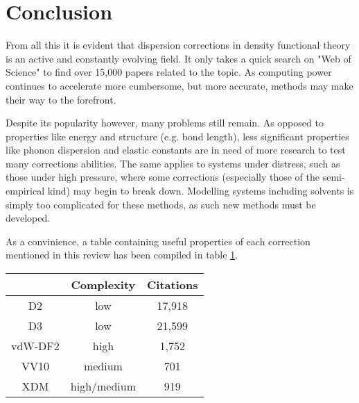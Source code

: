 \documentclass[10pt,a4paper,twocolumn,twoside]{extarticle}
\begin{document}
	\section{Conclusion}
	From all this it is evident that dispersion corrections in density functional theory is an active and constantly evolving field. It only takes a quick search on "Web of Science" to find over 15,000 papers related to the topic. As computing power continues to accelerate more cumbersome, but more accurate, methods may make their way to the forefront.

	Despite its popularity however, many problems still remain. As opposed to properties like energy and structure (e.g. bond length), less significant properties like phonon dispersion and elastic constants are in need of more research to test many corrections abilities. The same applies to systems under distress, such as those under high pressure, where some corrections (especially those of the semi-empirical kind) may begin to break down. Modelling systems including solvents is simply too complicated for these methods, as such new methods must be developed. 

	As a convinience, a table containing useful properties of each correction mentioned in this review has been compiled in table \ref{tab:conc}. 

	\begin{table}
		\label{tab:conc}
		\begin{tabular}{c|c c}
			& Complexity & Citations \\
			\hline
			D2 & low & 17,918\\
			D3 & low & 21,599\\
			vdW-DF2 & high & 1,752\\
			VV10 & medium & 701\\
			XDM & high/medium & 919\\
		\end{tabular}
	\end{table}


	\newpage
	\printbibliography
	
\end{document}
